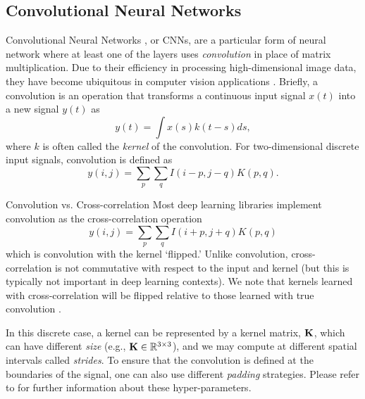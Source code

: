 \subsection{Convolutional Neural Networks}

Convolutional Neural Networks \citep{lecun_backpropagation_1989}, or CNNs, are a particular form of neural network where at least one of the layers uses \textit{convolution} in place of matrix multiplication. Due to their efficiency in processing high-dimensional image data, they have become ubiquitous in computer vision applications \citep{LeCun2015-qf}.  Briefly, a convolution is an operation that transforms a continuous input signal $x(t)$ into a new signal $y(t)$ as
\begin{equation}
y(t) = \int x(s) k(t - s) ds,	
\end{equation}
where $k$ is often called the \textit{kernel} of the convolution. For two-dimensional discrete input signals, convolution is defined as
\begin{equation}
\label{eq:math_convolution}
y(i, j) = \sum_p \sum_q I(i - p, j - q)	 K(p, q).
\end{equation}
\begin{remark}{Convolution vs. Cross-correlation} 
Most deep learning libraries implement convolution as the cross-correlation operation
\begin{equation}
y(i, j) = \sum_p \sum_q I(i + p, j + q)	 K(p, q)
\end{equation}
which is convolution with the kernel `flipped.' Unlike convolution, cross-correlation is not commutative with respect to the input and kernel (but this is typically not important in deep learning contexts). We note that kernels learned with cross-correlation will be flipped relative to those learned with true convolution \citep{Goodfellow-et-al-2016}.
\end{remark}
In this discrete case, a kernel can be represented by a kernel matrix, $\boldsymbol{\mathbf{K}}$, which can have different \textit{size} (e.g., $\boldsymbol{\mathbf{K}} \in \mathbb{R}^{3\times3}$), and we may  compute  at different spatial intervals called \textit{strides}. To ensure that the convolution is defined at the boundaries of the signal, one can also use different \textit{padding} strategies. Please refer to \cite{Goodfellow-et-al-2016} for further information about these hyper-parameters. 

